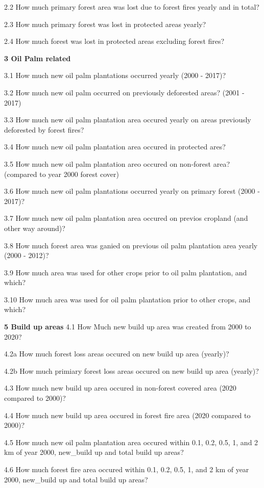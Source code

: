 \documentclass[
  letterpaper,
  DIV=11,
  numbers=noendperiod]{scrreprt}
\begin{document}
2.2 How much primary forest area was lost due to forest fires yearly and
in total?

2.3 How much primary forest was lost in protected areas yearly?

2.4 How much forest was lost in protected areas excluding forest fires?

\textbf{3 Oil Palm related}

3.1 How much new oil palm plantations occurred yearly (2000 - 2017)?

3.2 How much new oil palm occurred on previously deforested areas? (2001
- 2017)

3.3 How much new oil palm plantation area occured yearly on areas
previously deforested by forest fires?

3.4 How much new oil palm plantation area occured in protected ares?

3.5 How much new oil palm plantation areo occured on non-forest area?
(compared to year 2000 forest cover)

3.6 How much new oil palm plantations occurred yearly on primary forest
(2000 - 2017)?

3.7 How much new oil palm plantation area occured on previos cropland
(and other way around)?

3.8 How much forest area was ganied on previous oil palm plantation area
yearly (2000 - 2012)?

3.9 How much area was used for other crops prior to oil palm plantation,
and which?

3.10 How much area was used for oil palm plantation prior to other
crops, and which?

\textbf{5 Build up areas} 4.1 How Much new build up area was created
from 2000 to 2020?

4.2a How much forest loss areas occured on new build up area (yearly)?

4.2b How much primiary forest loss areas occured on new build up area
(yearly)?

4.3 How much new build up area occured in non-forest covered area (2020
compared to 2000)?

4.4 How much new build up area occured in forest fire area (2020
compared to 2000)?

4.5 How much new oil palm plantation area occured within 0.1, 0.2, 0.5,
1, and 2 km of year 2000, new\_build up and total build up areas?

4.6 How much forest fire area occured within 0.1, 0.2, 0.5, 1, and 2 km
of year 2000, new\_build up and total build up areas?
\end{document}
